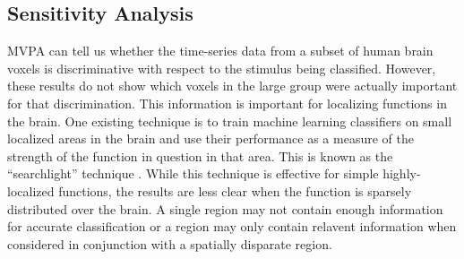 \documentclass[preprint,5p,authoryear]{elsarticle}
\begin{document}
\subsection{Sensitivity Analysis}
MVPA can tell us whether the time-series data from a subset of human brain voxels is discriminative with respect to the stimulus being classified. 
However, these results do not show which voxels in the large group were actually important for that discrimination.
This information is important for localizing functions in the brain.
One existing technique is to train machine learning classifiers on small localized areas in the brain and use their performance as a measure of the strength of the function in question in that area.
This is known as the ``searchlight'' technique \citep{Kriegeskorte2006}.
While this technique is effective for simple highly-localized functions, the results are less clear when the function is sparsely distributed over the brain.
A single region may not contain enough information for accurate classification or a region may only contain relavent information when considered in conjunction with a spatially disparate region.
\end{document}
